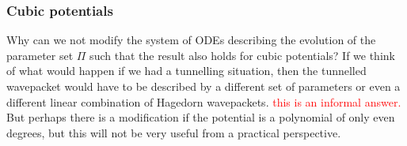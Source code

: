 \subsubsection{Cubic potentials}
Why can we not modify the system of ODEs describing the evolution of the 
parameter set $\Pi$ such that the result also holds for cubic potentials? 
If we think of what would happen if we had a tunnelling situation, then the 
tunnelled wavepacket would have to be described by a different set of parameters 
or even a different linear combination of Hagedorn wavepackets. 
\textcolor{red}{this is an informal answer.} But perhaps there is a modification 
if the potential is a polynomial of only even degrees, but this will not be very useful
from a practical perspective.
%
%
%
%
%

